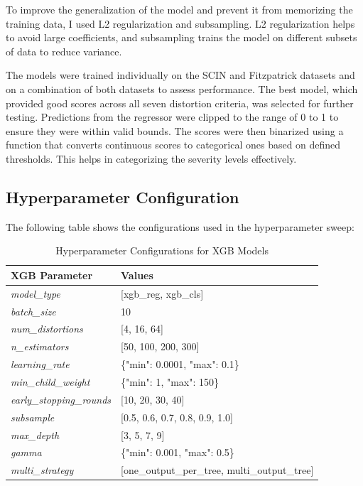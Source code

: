 \vspace{\baselineskip}
\noindent
To improve the generalization of the model and prevent it from memorizing the training data, I used L2 regularization and subsampling. L2 regularization helps to avoid large coefficients, and subsampling trains the model on different subsets of data to reduce variance. \par
\vspace{\baselineskip}
\noindent
The models were trained individually on the SCIN and Fitzpatrick datasets and on a combination of both datasets to assess performance. The best model, which provided good scores across all seven distortion criteria, was selected for further testing. Predictions from the regressor were clipped to the range of 0 to 1 to ensure they were within valid bounds. The scores were then binarized using a function that converts continuous scores to categorical ones based on defined thresholds. This helps in categorizing the severity levels effectively.\par

\subsection{Hyperparameter Configuration}
\label{sub:HyperparamConfig}
The following table shows the configurations used in the hyperparameter sweep: \par
\begin{table}[h]
    \centering
    \begin{tabular}{|l|l|}
        \hline
        \textbf{XGB Parameter} & \textbf{Values} \\
        \hline
        \textit{model\_type} & [xgb\_reg, xgb\_cls] \\
        \textit{batch\_size} & 10 \\
        \textit{num\_distortions} & [4, 16, 64] \\
        \textit{n\_estimators} & [50, 100, 200, 300] \\
        \textit{learning\_rate} & \{"min": 0.0001, "max": 0.1\} \\
        \textit{min\_child\_weight} & \{"min": 1, "max": 150\} \\
        \textit{early\_stopping\_rounds} & [10, 20, 30, 40] \\
        \textit{subsample} & [0.5, 0.6, 0.7, 0.8, 0.9, 1.0] \\
        \textit{max\_depth} & [3, 5, 7, 9] \\
        \textit{gamma} & \{"min": 0.001, "max": 0.5\} \\
        \textit{multi\_strategy} & [one\_output\_per\_tree, multi\_output\_tree] \\
        \hline
    \end{tabular}
    \caption{Hyperparameter Configurations for XGB Models}
    \label{table:xgb_hyperparams}
\end{table}

